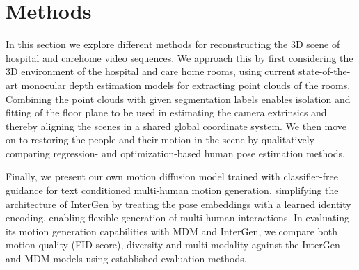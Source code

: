 \chapter{Methods}
In this section we explore different methods for reconstructing the 3D scene of hospital and carehome video sequences. We approach this by first considering the 3D environment of the hospital and care home rooms, using current state-of-the-art monocular depth estimation models for extracting point clouds of the rooms. Combining the point clouds with given segmentation labels enables isolation and fitting of the floor plane to be used in estimating the camera extrinsics and thereby aligning the scenes in a shared global coordinate system. We then move on to restoring the people and their motion in the scene by qualitatively comparing regression- and optimization-based human pose estimation methods. %

Finally, we present our own motion diffusion model trained with classifier-free guidance for text conditioned multi-human motion generation, simplifying the architecture of InterGen by treating the pose embeddings with a learned identity encoding, enabling flexible generation of multi-human interactions. In evaluating its motion generation capabilities with MDM and InterGen, we compare both motion quality (FID score), diversity and multi-modality against the InterGen and MDM models using established evaluation methods.


